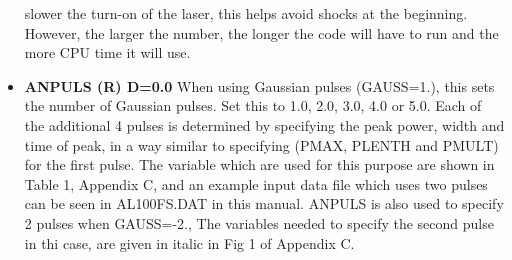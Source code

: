 \begin{itemize}
slower the turn-on of the laser,
this helps avoid shocks at the beginning.
However, the larger the number, the
longer the code will have to run and the more CPU time it will use.
\item {\bf ANPULS (R) D=0.0} When using Gaussian pulses (GAUSS=1.), this sets 
the number of Gaussian pulses. Set this to 1.0, 2.0, 3.0, 4.0 or 5.0. 
Each of the additional 4 pulses is determined by specifying the peak power,
width and time of peak, in a way similar to specifying (PMAX, PLENTH and PMULT) for the first
pulse. The variable which are used for this purpose are shown in Table 1, Appendix C,  and an example input data 
file which uses two pulses can be seen in 
AL100FS.DAT in this manual.
\newline
ANPULS is also used to specify 2 pulses when  GAUSS=-2., 
The variables needed to specify the second pulse in thi case, are given in italic in Fig 1 of Appendix C.
\end{itemize}
\vspace*{5mm}


